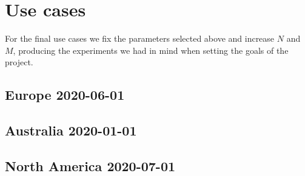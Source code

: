 \section{Use cases}\label{sec:exp-usecases}

For the final use cases we fix the parameters selected above and increase $N$ and $M$, producing the experiments we had in mind when setting the goals of the project.

\subsection{Europe 2020-06-01}

\subsection{Australia 2020-01-01}

\subsection{North America 2020-07-01}
